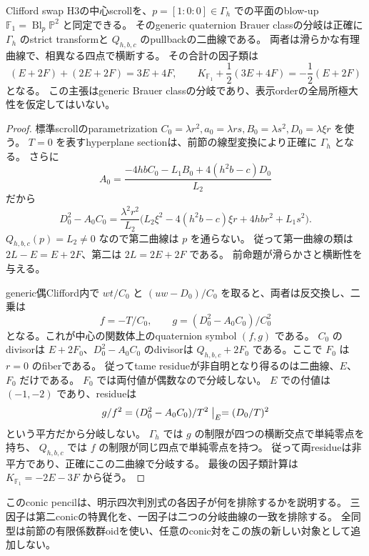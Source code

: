 \begin{theorem}
\label{thm:normal-order2-Brauer-ramification}
Clifford swap H3の中心scrollを、$p=[1:0:0]\in\Gamma_h$ での平面のblow-up
$\mathbb F_1=\operatorname{Bl}_p\mathbb P^2$ と同定できる。
そのgeneric quaternion Brauer classの分岐は正確に
$\Gamma_h$ のstrict transformと $Q_{h,b,c}$ のpullbackの二曲線である。
両者は滑らかな有理曲線で、相異なる四点で横断する。
その合計の因子類は
\[
 (E+2F)+(2E+2F)=3E+4F,
 \qquad
 K_{\mathbb F_1}+\frac12(3E+4F)=-\frac12(E+2F)
\]
となる。
この主張はgeneric Brauer classの分岐であり、表示orderの全局所極大性を仮定してはいない。
\end{theorem}
\begin{proof}
標準scrollのparametrization
$C_0=\lambda r^2,a_0=\lambda rs,B_0=\lambda s^2,D_0=\lambda\xi r$
を使う。
$T=0$ を表すhyperplane sectionは、前節の線型変換により正確に $\Gamma_h$ となる。
さらに
\[
 A_0=\frac{-4hbC_0-L_1B_0+4(h^2b-c)D_0}{L_2}
\]
だから
\[
 D_0^2-A_0C_0
 =\frac{\lambda^2r^2}{L_2}
 \bigl(L_2\xi^2-4(h^2b-c)\xi r+4hbr^2+L_1s^2\bigr).
\]
$Q_{h,b,c}(p)=L_2\ne0$ なので第二曲線は $p$ を通らない。
従って第一曲線の類は $2L-E=E+2F$、第二は $2L=2E+2F$ である。
前命題が滑らかさと横断性を与える。

generic偶Clifford内で $wt/C_0$ と $(uw-D_0)/C_0$ を取ると、両者は反交換し、二乗は
\[
 f=-T/C_0,\qquad g=(D_0^2-A_0C_0)/C_0^2
\]
となる。これが中心の関数体上のquaternion symbol $(f,g)$ である。
$C_0$ のdivisorは $E+2F_0$、$D_0^2-A_0C_0$ のdivisorは
$Q_{h,b,c}+2F_0$ である。ここで $F_0$ は $r=0$ のfiberである。
従ってtame residueが非自明となり得るのは二曲線、$E$、$F_0$ だけである。
$F_0$ では両付値が偶数なので分岐しない。
$E$ での付値は $(-1,-2)$ であり、residueは
\[
 g/f^2=(D_0^2-A_0C_0)/T^2\bigm|_E=(D_0/T)^2
\]
という平方だから分岐しない。
$\Gamma_h$ では $g$ の制限が四つの横断交点で単純零点を持ち、
$Q_{h,b,c}$ では $f$ の制限が同じ四点で単純零点を持つ。
従って両residueは非平方であり、正確にこの二曲線で分岐する。
最後の因子類計算は $K_{\mathbb F_1}=-2E-3F$ から従う。
\end{proof}

このconic pencilは、明示四次判別式の各因子が何を排除するかを説明する。
三因子は第二conicの特異化を、一因子は二つの分岐曲線の一致を排除する。
全同型は前節の有限係数群oidを使い、任意のconic対をこの族の新しい対象として追加しない。

